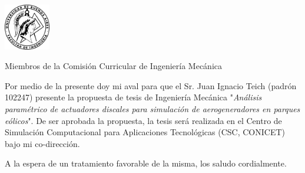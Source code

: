 \documentclass{letter}
\newcommand{\thesisname}{Análisis paramétrico de actuadores discales para simulación de aerogeneradores en parques eólicos}
\begin{document}
\begin{letter}{\includegraphics[width=0.15\textwidth]{Logo-fiuba.png}\hfill}

\opening{Miembros de la Comisión Curricular de Ingeniería Mecánica}
Por medio de la presente doy mi aval para que el Sr. Juan Ignacio Teich (padrón 102247) presente la propuesta de tesis de Ingeniería Mecánica "\textit{\thesisname}".  De ser aprobada la propuesta, la tesis será realizada en el Centro de Simulación Computacional para Aplicaciones Tecnológicas (CSC, CONICET) bajo mi co-dirección.
\closing{A la espera de un tratamiento favorable de la misma, los saludo cordialmente.}
\end{letter}
\end{document}
